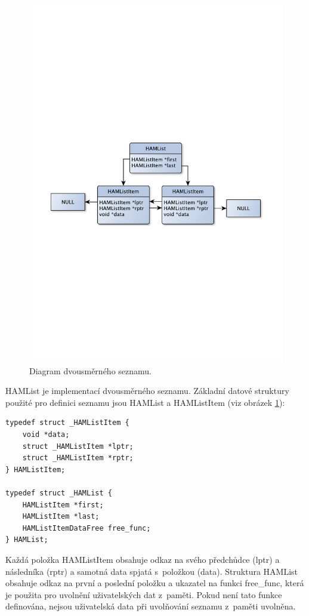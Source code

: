 \begin{figure}[h]
\centering
\includegraphics[trim=8cm 8cm 8cm 8cm, scale=0.6]{fig/list}
\caption{Diagram dvousměrného seznamu.}
\label{fig:hamlist}
\end{figure}

HAMList je implementací dvousměrného seznamu. Základní datové struktury použité pro definici seznamu jsou
HAMList a HAMListItem (viz obrázek \ref{fig:hamlist}):

\begin{verbatim}
typedef struct _HAMListItem {
	void *data;
	struct _HAMListItem *lptr;
	struct _HAMListItem *rptr;
} HAMListItem;

typedef struct _HAMList {
	HAMListItem *first;
	HAMListItem *last;
	HAMListItemDataFree free_func;
} HAMList;
\end{verbatim}

Každá položka HAMListItem obsahuje odkaz na svého předchůdce (lptr) a následníka (rptr) a samotná data spjatá
s~položkou (data). Struktura HAMList obsahuje odkaz na první a poslední položku a ukazatel na funkci free\_func,
která je použita pro uvolnění uživatelských dat z~paměti. Pokud není tato funkce definována, nejsou uživatelská
data při uvolňování seznamu z~paměti uvolněna.

